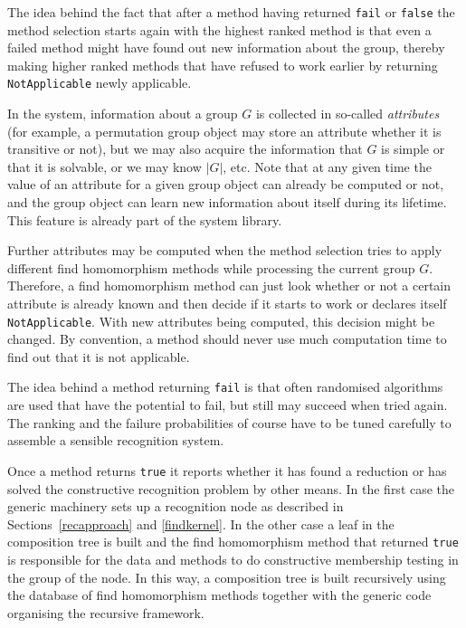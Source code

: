 The idea behind the fact that after a method having returned
\texttt{fail} or \texttt{false} the method selection starts again
with the highest ranked method is that even a failed method might
have found out new information about the group, thereby making
higher ranked methods that have refused to work earlier by
returning \texttt{NotApplicable} newly applicable.

In the {\GAP} system, information about a group $G$ is collected in
so-called {\em attributes} (for example,
a permutation group object may store an attribute whether it is transitive
or not), but we may also acquire the information that 
$G$ is simple or that it is solvable, or we may know $|G|$, etc. 
Note that at any given time the value of an attribute for a given group
object can already be computed or not, and the group object can learn new
information about itself during its lifetime. This feature is already
part of the {\GAP} system library. 

Further attributes may be
computed when the method selection tries to apply
different find homomorphism methods while processing the current group $G$.
Therefore, a find homomorphism method can just look whether or not
a certain attribute is already known and then decide if it starts
to work or declares itself \texttt{NotApplicable}. With new attributes
being computed, this decision might be changed. By convention, a method
should never use much computation time to find out that it is not
applicable.

The idea behind a method returning \texttt{fail} is that often
randomised algorithms are used that have the potential to fail,
but still may succeed when tried again. The ranking and the failure 
probabilities of course have to be tuned carefully to assemble
a sensible recognition system.

Once a method returns \texttt{true} it reports whether it has found a
reduction or has solved the constructive recognition problem by other
means. In the first case the generic machinery sets up a recognition node
as described in Sections~\ref{recapproach} and \ref{findkernel}. In the
other case a leaf in the composition tree is built and the find
homomorphism method that returned \texttt{true} is responsible for the
data and methods to do constructive membership testing in the group 
of the node. In this way, a composition tree is built recursively using the
database of find homomorphism methods together with the generic code
organising the recursive framework.

